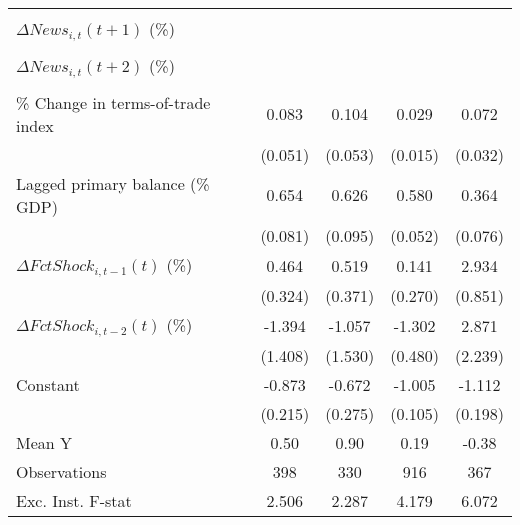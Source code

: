 {\begin{tabular}{l*{4}{c}}
                    &                     &                     &                     &                     \\
\addlinespace
$ \Delta News_{i,t}(t+1)$ (\%)&                     &                     &                     &                     \\
                    &                     &                     &                     &                     \\
\addlinespace
$ \Delta News_{i,t}(t+2)$ (\%)&                     &                     &                     &                     \\
                    &                     &                     &                     &                     \\
\addlinespace
\% Change in terms-of-trade index&       0.083         &       0.104\sym{*}  &       0.029\sym{*}  &       0.072\sym{**} \\
                    &     (0.051)         &     (0.053)         &     (0.015)         &     (0.032)         \\
\addlinespace
Lagged primary balance (\% GDP)&       0.654\sym{***}&       0.626\sym{***}&       0.580\sym{***}&       0.364\sym{***}\\
                    &     (0.081)         &     (0.095)         &     (0.052)         &     (0.076)         \\
\addlinespace
$ \Delta FctShock_{i,t-1}(t)$ (\%)&       0.464         &       0.519         &       0.141         &       2.934\sym{***}\\
                    &     (0.324)         &     (0.371)         &     (0.270)         &     (0.851)         \\
\addlinespace
$ \Delta FctShock_{i,t-2}(t)$ (\%)&      -1.394         &      -1.057         &      -1.302\sym{***}&       2.871         \\
                    &     (1.408)         &     (1.530)         &     (0.480)         &     (2.239)         \\
\addlinespace
Constant            &      -0.873\sym{***}&      -0.672\sym{**} &      -1.005\sym{***}&      -1.112\sym{***}\\
                    &     (0.215)         &     (0.275)         &     (0.105)         &     (0.198)         \\
\midrule
Mean Y              &        0.50         &        0.90         &        0.19         &       -0.38         \\
Observations        &         398         &         330         &         916         &         367         \\
Exc. Inst. F-stat   &       2.506         &       2.287         &       4.179         &       6.072         \\
\bottomrule
\end{tabular}
}
